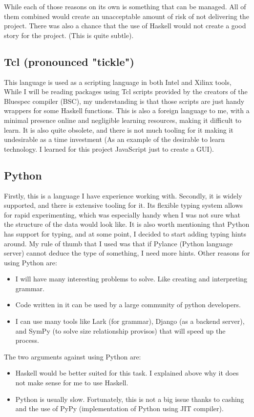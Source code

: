 \documentclass[12pt]{report}
\begin{document}
While each of those reasons on its own is something that can be managed. All of them combined would create an unacceptable amount of risk of not delivering the project. There was also a chance that the use of Haskell would not create a good story for the project. (This is quite subtle). 

\subsection{Tcl (pronounced "tickle")}
This language is used as a scripting language in both Intel and Xilinx tools, While I will be reading packages using Tcl scripts provided by the creators of the Bluespec compiler (BSC), my understanding is that those scripts are just handy wrappers for some Haskell functions. This is also a foreign language to me, with a minimal presence online and negligible learning resources, making it difficult to learn. It is also quite obsolete, and there is not much tooling for it making it undesirable as a time investment (As an example of the desirable to learn technology. I learned for this project JavaScript just to create a GUI). 
\subsection{Python}
Firstly, this is a language I have experience working with. Secondly, it is widely supported, and there is extensive tooling for it. Its flexible typing system allows for rapid experimenting, which was especially handy when I was not sure what the structure of the data would look like. It is also worth mentioning that Python has support for typing, and at some point, I decided to start adding typing hints around. My rule of thumb that I used was that if Pylance (Python language server) cannot deduce the type of something, I need more hints.  
Other reasons for using Python are:  
\begin{itemize}  
  \item I will have many interesting problems to solve. Like creating and interpreting grammar.  
  \item Code written in it can be used by a large community of python developers.  
  \item I can use many tools like Lark (for grammar), Django (as a backend server), and SymPy (to solve size relationship provisos) that will speed up the process.  
\end{itemize}  
The two arguments against using Python are:  
\begin{itemize}  
  \item Haskell would be better suited for this task. I explained above why it does not make sense for me to use Haskell.  
  \item Python is usually slow. Fortunately, this is not a big issue thanks to cashing and the use of PyPy (implementation of Python using JIT compiler).  
\end{itemize} 
\end{document}
